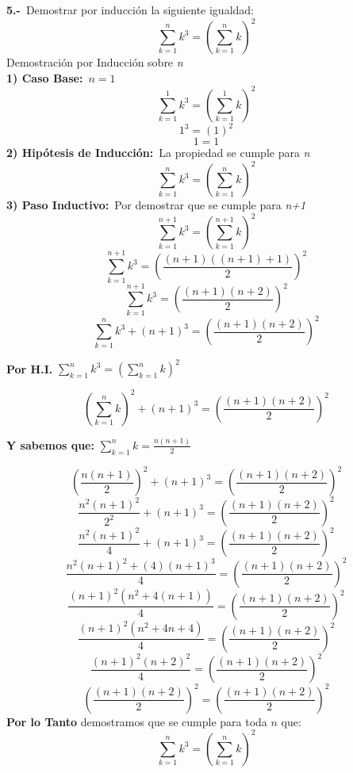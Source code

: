 \textbf{5.-}\ Demostrar por inducción la siguiente igualdad:
\[
\sum_{k=1}^{n}k^{3} = \left(\sum_{k=1}^{n}k\right)^{2}
\]
\newline
Demostración por Inducción sobre \textit{n}\\
\newline
\textbf{1) Caso Base:}\ $n = 1$
\[
\sum_{k=1}^{1}k^{3} = \left(\sum_{k=1}^{1}k\right)^{2}
\]
\[
1^{3} = (1)^{2}
\]
\[
1 = 1
\]
\textbf{2) Hipótesis de Inducción:}\  La propiedad se cumple para \textit{n}\
\[
\sum_{k=1}^{n}k^{3} = \left(\sum_{k=1}^{n}k\right)^{2}
\]
\textbf{3) Paso Inductivo:}\  Por demostrar que se cumple para \textit{n+1}\
\[
\sum_{k=1}^{n+1}k^{3} = \left(\sum_{k=1}^{n+1}k\right)^{2}
\]
\[
\sum_{k=1}^{n+1}k^{3} = \left(\frac{(n+1)((n+1)+1)}{2}\right)^{2}
\]
\[
\sum_{k=1}^{n+1}k^{3} = \left(\frac{(n+1)(n+2)}{2}\right)^{2}
\]
\[
\sum_{k=1}^{n}k^{3} + (n+1)^{3}= \left(\frac{(n+1)(n+2)}{2}\right)^{2}
\]
\begin{center}
\textbf{Por H.I.} $\sum_{k=1}^{n}k^{3} = \left(\sum_{k=1}^{n}k\right)^{2}$
\end{center}
\[
\left(\sum_{k=1}^{n}k\right)^{2} + (n+1)^{3}= \left(\frac{(n+1)(n+2)}{2}\right)^{2}
\]
\begin{center}
\textbf{Y sabemos que:} $\sum_{k=1}^{n}k= \frac{n(n+1)}{2}$
\end{center}
\[
\left(\frac{n(n+1)}{2}\right)^{2} + (n+1)^{3} = \left(\frac{(n+1)(n+2)}{2}\right)^{2}
\]
\[
\frac{n^{2}(n+1)^{2}}{2^{2}} + (n+1)^{3} = \left(\frac{(n+1)(n+2)}{2}\right)^{2}
\]
\[
\frac{n^{2}(n+1)^{2}}{4} + (n+1)^{3} = \left(\frac{(n+1)(n+2)}{2}\right)^{2}
\]
\[
\frac{{n^{2}(n+1)^{2}} + (4)(n+1)^{3}}{4} = \left(\frac{(n+1)(n+2)}{2}\right)^{2}
\]
\[
\frac{(n+1)^{2}(n^{2}+4(n+1))}{4} = \left(\frac{(n+1)(n+2)}{2}\right)^{2}
\]
\[
\frac{(n+1)^{2}(n^{2}+4n+4)}{4} = \left(\frac{(n+1)(n+2)}{2}\right)^{2}
\]
\[
\frac{(n+1)^{2}(n+2)^{2}}{4} = \left(\frac{(n+1)(n+2)}{2}\right)^{2}
\]
\[
\left(\frac{(n+1)(n+2)}{2}\right)^{2} = \left(\frac{(n+1)(n+2)}{2}\right)^{2}
\]
\newline
\textbf{Por lo Tanto} demostramos que se cumple para toda $n$ que:
\[
\sum_{k=1}^{n}k^{3} = \left(\sum_{k=1}^{n}k\right)^{2}
\]
